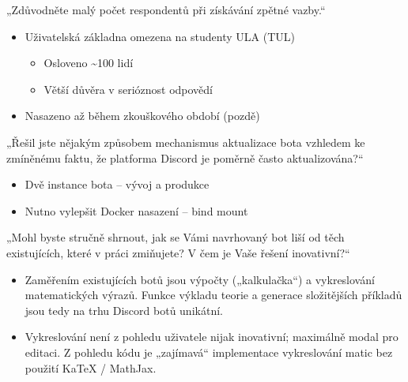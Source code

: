 \documentclass[FM]{tulpresentation}
\begin{document}
	\TULendframe

	\begin{frame}
		\bigskip
		„Zdůvodněte malý počet respondentů při získávání zpětné vazby.“
		\bigskip
		\begin{itemize}
			\item Uživatelská základna omezena na studenty ULA (TUL)
			\begin{itemize}
				\item Osloveno \textasciitilde100 lidí
				\item Větší důvěra v serióznost odpovědí
			\end{itemize}
			\item Nasazeno až během zkouškového období (pozdě)
		\end{itemize}
	\end{frame}
	
	\begin{frame}
		\bigskip
		„Řešil jste nějakým způsobem mechanismus aktualizace bota vzhledem ke zmíněnému faktu, že platforma Discord je poměrně často aktualizována?“
		\bigskip
		\begin{itemize}
			\item Dvě instance bota – vývoj a produkce
			\item Nutno vylepšit Docker nasazení – bind mount
		\end{itemize}
	\end{frame}
	
	\begin{frame}
		\bigskip
		„Mohl byste stručně shrnout, jak se Vámi navrhovaný bot liší od těch existujících, které v práci zmiňujete? V
		čem je Vaše řešení inovativní?“
		\bigskip
		\begin{itemize}		
		\item Zaměřením existujících botů jsou výpočty („kalkulačka“) a vykreslování matematických výrazů. Funkce výkladu teorie a generace složitějších příkladů jsou tedy na trhu Discord botů unikátní.
		\item Vykreslování není z pohledu uživatele nijak inovativní; maximálně modal pro editaci. Z pohledu kódu je „zajímavá“ implementace vykreslování matic bez použití KaTeX / MathJax.
		\end{itemize}
	\end{frame}
	
\end{document}
